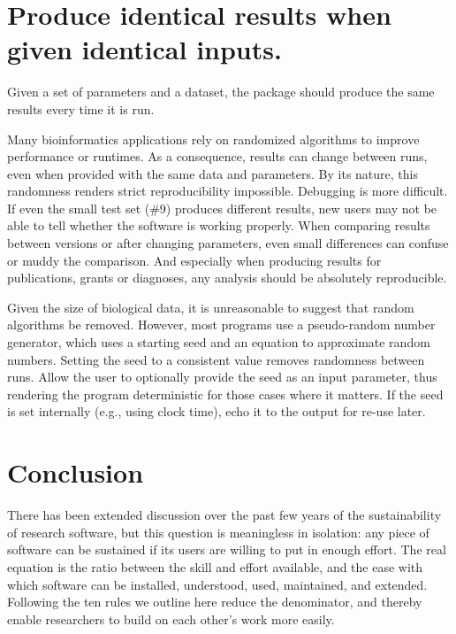 \documentclass[10pt]{article}
\begin{document}
\section{Produce identical results when given identical inputs.}

Given a set of parameters and a dataset, the package should produce the
same results every time it is run.

Many bioinformatics applications rely on randomized algorithms to
improve performance or runtimes. As a consequence, results can change
between runs, even when provided with the same data and parameters. By
its nature, this randomness renders strict reproducibility impossible.
Debugging is more difficult. If even the small test set (\#9) produces
different results, new users may not be able to tell whether the software is
working properly. When comparing
results between versions or after changing parameters, even small
differences can confuse or muddy the comparison. And especially when
producing results for publications, grants or diagnoses, any analysis
should be absolutely reproducible.

Given the size of biological data, it is unreasonable to suggest that
random algorithms be removed. However, most programs use a pseudo-random
number generator, which uses a starting seed and an equation to
approximate random numbers. Setting the seed to a consistent value
removes randomness between runs. Allow the user to optionally provide
the seed as an input parameter, thus rendering the program deterministic
for those cases where it matters. If the seed is set internally (e.g.,
using clock time), echo it to the output for re-use later.

\section*{Conclusion}

There has been extended discussion over the past few years of the
sustainability of research software, but this question is meaningless
in isolation: any piece of software can be sustained if its users are
willing to put in enough effort.  The real equation is the ratio
between the skill and effort available, and the ease with which
software can be installed, understood, used, maintained, and extended.
Following the ten rules we outline here reduce the denominator, and
thereby enable researchers to build on each other's work more easily.


\end{document}
